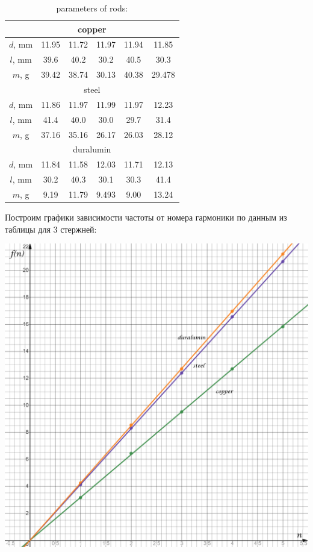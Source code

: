 \documentclass[a4paper,12pt]{article}
\begin{document}
\begin{table}
\caption{parameters of rods:}
\begin{center}
\begin{tabular}{|c|c|c|c|c|c|}
\hline 
\multicolumn{6}{|c|}{copper}\\ 
\hline 
\( d \), mm & 11.95 & 11.72 & 11.97 & 11.94 & 11.85  \\ 
\hline 
\( l \), mm & 39.6 & 40.2 & 30.2 & 40.5 & 30.3 \\ 
\hline 
\( m \), g & 39.42 & 38.74 & 30.13 & 40.38 & 29.478 \\ 
\hline 
\multicolumn{6}{|c|}{steel} \\ 
\hline 
\( d \), mm & 11.86 & 11.97 & 11.99 & 11.97 & 12.23 \\ 
\hline 
\( l \), mm & 41.4 & 40.0 & 30.0 & 29.7 & 31.4 \\ 
\hline 
\( m \), g & 37.16 & 35.16 & 26.17 & 26.03 & 28.12 \\ 
\hline 
\multicolumn{6}{|c|}{duralumin} \\
\hline 
\( d \), mm & 11.84 & 11.58 & 12.03 & 11.71 & 12.13  \\ 
\hline 
\( l \), mm & 30.2 & 40.3 & 30.1 & 30.3 & 41.4 \\ 
\hline 
\( m \), g & 9.19 & 11.79 & 9.493 & 9.00 & 13.24 \\
\hline 
\end{tabular} 
\end{center}
\end{table}

Построим графики зависимости частоты от номера гармоники по данным из таблицы для 3 стержней:\\
\begin{center}
\includegraphics[scale = 0.3]{1.4.8.1.png}
\end{center}
\end{document}
